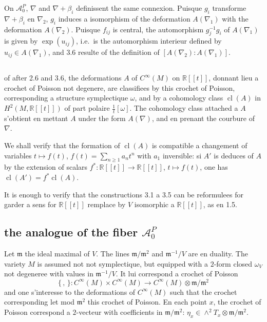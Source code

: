\documentclass[11pt,a4paper]{article}
\theoremstyle{plain}
\theoremstyle{definition}
\DeclareMathOperator{\cl}{cl}
\newcommand{\R}{\mathbb{R}}
\begin{document}
On $\mathcal{A}_{0}^{P}$, $\nabla$ and $\nabla + \beta_{i}$ definissent the same connexion. Puisque $g_{i}$ transforme $\nabla + \beta_{i}$ en $\nabla_{2}$, $g_{i}$ induces a isomorphism of the deformation $A(\nabla_{1})$ with the deformation $A(\nabla_{2})$. Puisque $f_{ij}$ is central, the automorphism $g_{j}^{-1} g_{i}$ of $A(\nabla_{1})$ is given by $\exp(u_{ij})$, i.e.\ is the automorphism interieur defined by $u_{ij} \in A(\nabla_{1})$, and 3.6 resulte of the definition of $[A(\nabla_{2}) : A(\nabla_{1})]$.

\subsection{}
of after 2.6 and 3.6, the deformations $A$ of $C^{\infty}(M)$ on $\R[[t]]$, donnant lieu a crochet of Poisson not degenere, are classifiees by this crochet of Poisson,
corresponding a structure symplectique $\omega$, and by a cohomology class
$\cl(A)$ in $H^{2}(M, \R[[t]])$ of part polaire $\frac{1}{t}[\omega]$. The cohomology class attached
a $A$ s'obtient en mettant $A$ under the form $A(\nabla)$, and en prenant the courbure of $\nabla$.

We shall verify that the formation of $\cl(A)$ is compatible a changement of variables $t \mapsto f(t)$, $f(t) = \sum_{n \geq 1} a_{n} t^{n}$ with $a_{1}$ inversible: si $A'$ is deduces of $A$ by the extension of scalars $f^{*}: \R[[t]] \to \R[[t]]$, $t \mapsto f(t)$, one has $\cl(A') = f^{*}\cl(A)$.

It is enough to verify that the constructions 3.1 a 3.5 can be reformulees
for garder a sens for $\R[[t]]$ remplace by $V$ isomorphic a $\R[[t]]$, as en 1.5.

\subsection{the analogue of the fiber $\mathcal{A}_{0}^{P}$}
Let $\mathfrak{m}$ the ideal maximal of $V$. The lines $\mathfrak{m}/\mathfrak{m}^{2}$ and $\mathfrak{m}^{-1}/V$ are en duality. The variety $M$ is assumed not not symplectique, but equipped with a $2$-form closed $\omega_{V}$ not degeneree with values in $\mathfrak{m}^{-1}/V$. It lui correspond a crochet of Poisson
\[
\{\, , \,\}: C^{\infty}(M) \times C^{\infty}(M) \longrightarrow C^{\infty}(M) \otimes \mathfrak{m}/\mathfrak{m}^{2}
\]
and one s'interesse to the deformations of $C^{\infty}(M)$ such that the crochet corresponding let mod $\mathfrak{m}^{2}$ this crochet of Poisson. En each point $x$, the crochet of Poisson correspond a $2$-vecteur with coefficients in $\mathfrak{m}/\mathfrak{m}^{2}$: $\eta_{x} \in \wedge^{2} T_{x} \otimes \mathfrak{m}/\mathfrak{m}^{2}$.
\end{document}
